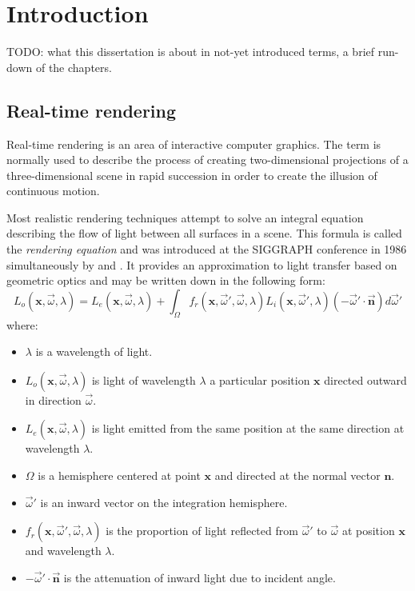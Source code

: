 
\chapter{ Introduction }
\label{Chapter1}

TODO: what this dissertation is about in not-yet introduced terms, a brief run-down of the chapters.

\section{Real-time rendering}

Real-time rendering is an area of interactive computer graphics. The term is normally used to describe the process of creating two-dimensional projections of a three-dimensional scene in rapid succession in order to create the illusion of continuous motion.

Most realistic rendering techniques attempt to solve an integral equation describing the flow of light between all surfaces in a scene. This formula is called the \emph{rendering equation} and was introduced at the SIGGRAPH conference in 1986 simultaneously by \citet{Kajiya86RenderingEq} and \citet{Immel86}. It provides an approximation to light transfer based on geometric optics and may be written down in the following form:
\[
L_o(\mathbf x, \overrightarrow{\omega}, \lambda) = L_e(\mathbf x, \overrightarrow{\omega}, \lambda) + \int_\Omega f_r(\mathbf x, \overrightarrow{\omega}', \overrightarrow{\omega}, \lambda) L_i(\mathbf x, \overrightarrow{\omega}', \lambda) (-\overrightarrow{\omega}' \cdot \overrightarrow{\mathbf n}) d \overrightarrow{\omega}'
\]
where:
\begin{itemize}
\item $\lambda$ is a wavelength of light.
\item $L_o(\mathbf x, \overrightarrow{\omega}, \lambda)$ is light of wavelength $\lambda$ a particular position $\mathbf x$ directed outward in direction $\overrightarrow{\omega}$.
\item $L_e(\mathbf x, \overrightarrow{\omega}, \lambda)$ is light emitted from the same position at the same direction at wavelength $\lambda$.
\item $\Omega$ is a hemisphere centered at point $\mathbf x$ and directed at the normal vector $\mathbf n$.
\item $\overrightarrow{\omega}'$ is an inward vector on the integration hemisphere.
\item $f_r(\mathbf x, \overrightarrow{\omega}', \overrightarrow{\omega}, \lambda)$ is the proportion of light reflected from $\overrightarrow{\omega}'$ to $\overrightarrow{\omega}$ at position $\mathbf x$ and wavelength $\lambda$.
\item $-\overrightarrow{\omega}' \cdot \overrightarrow{\mathbf n}$ is the attenuation of inward light due to incident angle.
\end{itemize}

